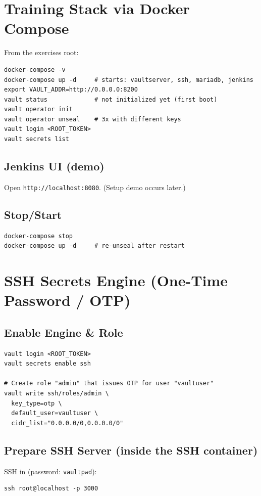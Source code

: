 \documentclass[11pt]{article}
\begin{document}
\section{Training Stack via Docker Compose}
From the exercises root:
\begin{verbatim}
docker-compose -v
docker-compose up -d     # starts: vaultserver, ssh, mariadb, jenkins
export VAULT_ADDR=http://0.0.0.0:8200
vault status             # not initialized yet (first boot)
vault operator init
vault operator unseal    # 3x with different keys
vault login <ROOT_TOKEN>
vault secrets list
\end{verbatim}

\subsection*{Jenkins UI (demo)}
Open \texttt{http://localhost:8080}. (Setup demo occurs later.)

\subsection*{Stop/Start}
\begin{verbatim}
docker-compose stop
docker-compose up -d     # re-unseal after restart
\end{verbatim}

\section{SSH Secrets Engine (One-Time Password / OTP)}
\subsection*{Enable Engine \& Role}
\begin{verbatim}
vault login <ROOT_TOKEN>
vault secrets enable ssh

# Create role "admin" that issues OTP for user "vaultuser"
vault write ssh/roles/admin \
  key_type=otp \
  default_user=vaultuser \
  cidr_list="0.0.0.0/0,0.0.0.0/0"
\end{verbatim}
\clearpage

\subsection*{Prepare SSH Server (inside the SSH container)}
SSH in (password: \texttt{vaultpwd}):
\begin{verbatim}
ssh root@localhost -p 3000
\end{verbatim}
\end{document}
